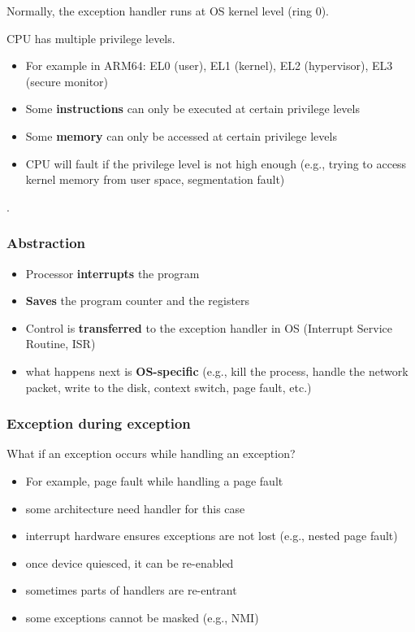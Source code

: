 \documentclass[letterpaper,12pt]{article}
\begin{document}
Normally, the exception handler runs at OS kernel level (ring 0). 

CPU has multiple privilege levels. \begin{itemize}
    \item For example in ARM64: EL0 (user), EL1 (kernel), EL2 (hypervisor), EL3 (secure monitor)
    \item Some \textbf{instructions} can only be executed at certain privilege levels
    \item Some \textbf{memory} can only be accessed at certain privilege levels
    \item CPU will fault if the privilege level is not high enough (e.g., trying to access kernel memory from user space, segmentation fault)
\end{itemize}.
\subsubsection{Abstraction}
\begin{itemize}
    \item Processor \textbf{interrupts} the program
    \item \textbf{Saves} the program counter and the registers
    \item Control is \textbf{transferred} to the exception handler in OS (Interrupt Service Routine, ISR)
    \item what happens next is \textbf{OS-specific} (e.g., kill the process, handle the network packet, write to the disk, context switch, page fault, etc.)
\end{itemize}
\subsubsection{Exception during exception}
What if an exception occurs while handling an exception? \begin{itemize}
    \item For example, page fault while handling a page fault
    \item some architecture need handler for this case
    \item interrupt hardware ensures exceptions are not lost (e.g., nested page fault)
    \item once device quiesced, it can be re-enabled
    \item sometimes parts of handlers are re-entrant
    \item some exceptions cannot be masked (e.g., NMI)
\end{itemize}
\end{document}
